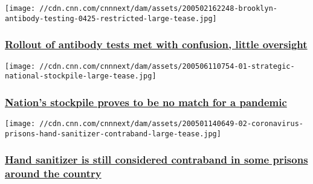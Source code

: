 \href{/2020/05/07/politics/coronavirus-antibody-testing-problems-cdc-fda-invs/index.html}{}

\texttt{[image: //cdn.cnn.com/cnnnext/dam/assets/200502162248-brooklyn-antibody-testing-0425-restricted-large-tease.jpg]}

\hypertarget{rollout-of-antibody-tests-met-with-confusion-little-oversight}{%
\subsubsection{\texorpdfstring{\href{/2020/05/07/politics/coronavirus-antibody-testing-problems-cdc-fda-invs/index.html}{Rollout
of antibody tests met with confusion, little
oversight}}{Rollout of antibody tests met with confusion, little oversight}}\label{rollout-of-antibody-tests-met-with-confusion-little-oversight}}

\href{/2020/05/06/politics/strategic-national-stockpile-coronavirus-trump-invs/index.html}{}

\texttt{[image: //cdn.cnn.com/cnnnext/dam/assets/200506110754-01-strategic-national-stockpile-large-tease.jpg]}

\hypertarget{nations-stockpile-proves-to-be-no-match-for-a-pandemic}{%
\subsubsection{\texorpdfstring{\href{/2020/05/06/politics/strategic-national-stockpile-coronavirus-trump-invs/index.html}{Nation's
stockpile proves to be no match for a
pandemic}}{Nation's stockpile proves to be no match for a pandemic}}\label{nations-stockpile-proves-to-be-no-match-for-a-pandemic}}

\href{/2020/05/05/us/coronavirus-prison-hand-sanitizer-contraband-invs/index.html}{}

\texttt{[image: //cdn.cnn.com/cnnnext/dam/assets/200501140649-02-coronavirus-prisons-hand-sanitizer-contraband-large-tease.jpg]}

\hypertarget{hand-sanitizer-is-still-considered-contraband-in-some-prisons-around-the-country-}{%
\subsubsection{\texorpdfstring{\href{/2020/05/05/us/coronavirus-prison-hand-sanitizer-contraband-invs/index.html}{Hand
sanitizer is still considered contraband in some prisons around the
country
}}{Hand sanitizer is still considered contraband in some prisons around the country }}\label{hand-sanitizer-is-still-considered-contraband-in-some-prisons-around-the-country-}}

